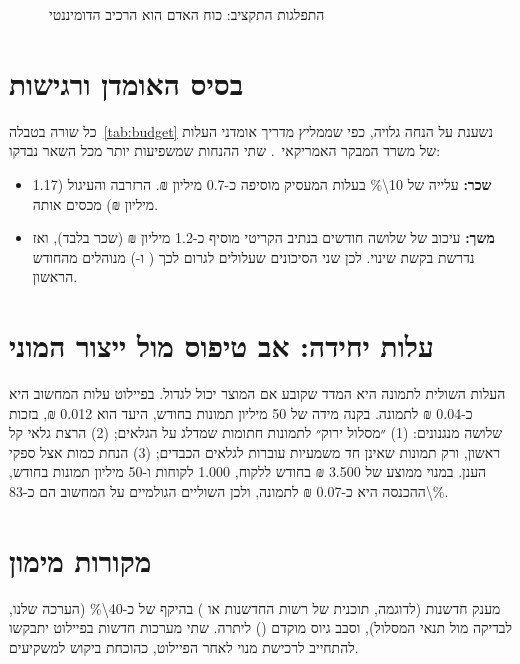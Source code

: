 \begin{figure}[!htb]
\begin{ltrdiagram}

\end{ltrdiagram}
\caption{התפלגות התקציב: כוח האדם הוא הרכיב הדומיננטי}\label{fig:budget}
\end{figure}

\section{בסיס האומדן ורגישות}
כל שורה בטבלה~\ref{tab:budget} נשענת על הנחה גלויה, כפי שממליץ מדריך אומדני העלות של משרד המבקר האמריקאי~\cite{gao2020}. שתי ההנחות שמשפיעות יותר מכל השאר נבדקו:
\begin{itemize}
\item \textbf{שכר:} עלייה של \num{10\%} בעלות המעסיק מוסיפה כ-\num{0.7} מיליון ₪. הרזרבה והעיגול (\num{1.17} מיליון ₪) מכסים אותה.
\item \textbf{משך:} עיכוב של שלושה חודשים בנתיב הקריטי מוסיף כ-\num{1.2} מיליון ₪ (שכר בלבד), ואז נדרשת בקשת שינוי. לכן שני הסיכונים שעלולים לגרום לכך ( ו-) מנוהלים מהחודש הראשון.
\end{itemize}

\section{עלות יחידה: אב טיפוס מול ייצור המוני}
העלות השולית לתמונה היא המדד שקובע אם המוצר יכול לגדול. בפיילוט עלות המחשוב היא כ-\num{0.04} ₪ לתמונה. בקנה מידה של \num{50} מיליון תמונות בחודש, היעד הוא \num{0.012} ₪, בזכות שלושה מנגנונים: (\num{1}) ״מסלול ירוק״ לתמונות חתומות שמדלג על הגלאים; (\num{2}) הרצת גלאי קל ראשון, ורק תמונות שאינן חד משמעיות עוברות לגלאים הכבדים; (\num{3}) הנחת כמות אצל ספקי הענן. במנוי ממוצע של \num{3,500} ₪ בחודש ללקוח, \num{1,000} לקוחות ו-\num{50} מיליון תמונות בחודש, ההכנסה היא כ-\num{0.07} ₪ לתמונה, ולכן השוליים הגולמיים על המחשוב הם כ-\num{83\%}.

\section{מקורות מימון}
מענק חדשנות (לדוגמה, תוכנית של רשות החדשנות או ) בהיקף של כ-\num{40\%} (הערכה שלנו, לבדיקה מול תנאי המסלול), וסבב גיוס מוקדם () ליתרה. שתי מערכות חדשות בפיילוט יתבקשו להתחייב לרכישת מנוי לאחר הפיילוט, כהוכחת ביקוש למשקיעים.
